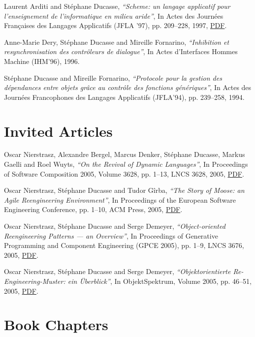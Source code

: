 \documentclass{article}
\newcommand{\czauthors}[1]{#1}
\newcommand{\cztitle}[1]{\emph{``#1''}}
\newcommand{\czjournal}[1]{#1}
\newcommand{\czbooktitle}[1]{#1}
\begin{document}
\begin{itemize}
	\pub  \czauthors{Laurent Arditi and St\'ephane Ducasse},  \cztitle{Scheme: un langage applicatif pour l'enseignement de l'informatique en milieu aride},  In \czbooktitle{Actes des Journ\'ees Fran\c{c}aises des Langages Applicatifs (JFLA '97)}, pp. 209--228, 1997, \href{http://rmod-files.lille.inria.fr/Team/Texts/Papers/Ardi97a-JFLA07-SchemeTeaching.pdf}{PDF}.

	\pub  \czauthors{Anne-Marie Dery, St\'ephane Ducasse and Mireille Fornarino},  \cztitle{Inhibition et resynchronisation des contr\^oleurs de dialogue},  In \czbooktitle{Actes d'Interfaces Hommes Machine (IHM'96)}, 1996.

	\pub  \czauthors{St\'ephane Ducasse and Mireille Fornarino},  \cztitle{Protocole pour la gestion des d\'ependances entre objets gr\^ace au contr\^ole des fonctions g\'en\'eriques},  In \czbooktitle{Actes des Journ\'ees Francophones des Langages Applicatifs (JFLA'94)}, pp. 239--258, 1994.

\end{itemize}\section{Invited Articles}

\begin{itemize}

	\pub  \czauthors{Oscar Nierstrasz, Alexandre Bergel, Marcus Denker, St\'ephane Ducasse, Markus Gaelli and Roel Wuyts},  \cztitle{On the Revival of Dynamic Languages},  In \czbooktitle{Proceedings of Software Composition 2005}, Volume 3628, pp. 1--13, LNCS 3628, 2005, \href{http://rmod-files.lille.inria.fr/Team/Texts/Papers/Nier05b-SC05-Revival.pdf}{PDF}.

	\pub  \czauthors{Oscar Nierstrasz, St\'ephane Ducasse and Tudor G\^irba},  \cztitle{The Story of {Moose}: an Agile Reengineering Environment},  In \czbooktitle{Proceedings of the European Software Engineering Conference}, pp. 1--10, ACM Press, 2005, \href{http://rmod-files.lille.inria.fr/Team/Texts/Papers/Nier05cStoryOfMoose.pdf}{PDF}.

	\pub  \czauthors{Oscar Nierstrasz, St\'ephane Ducasse and Serge Demeyer},  \cztitle{Object-oriented Reengineering Patterns --- an Overview},  In \czbooktitle{Proceedings of Generative Programming and Component Engineering (GPCE 2005)}, pp. 1--9, LNCS 3676, 2005, \href{http://rmod-files.lille.inria.fr/Team/Texts/Papers/Nier05dReengineeringPatterns.pdf}{PDF}.

	\pub  \czauthors{Oscar Nierstrasz, St\'ephane Ducasse and Serge Demeyer},  \cztitle{Objektorientierte Re-Engineering-Muster: ein \"{U}berblick},  In \czjournal{ObjektSpektrum}, Volume 2005, pp. 46--51, 2005, \href{http://rmod-files.lille.inria.fr/Team/Texts/Papers/Nier05fOORM.pdf}{PDF}.

\end{itemize}\section{Book Chapters}
\end{document}
